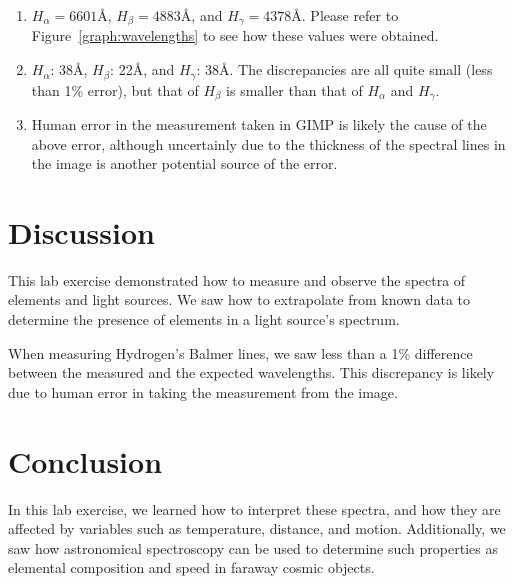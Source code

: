\documentclass[11pt]{article}
\begin{document}
\begin{enumerate}[label={\textbf{\emph{(\arabic*)}}}]
	\item %
$H_\alpha = 6601$\r{A}, $H_\beta = 4883$\r{A}, and $H_\gamma = 4378$\r{A}.
Please refer to Figure~\ref{graph:wavelengths} to see how these values were obtained.

	\item %
$H_\alpha$: 38\r{A}, $H_\beta$: 22\r{A}, and $H_\gamma$: 38\r{A}.
The discrepancies are all quite small (less than 1\% error), but that of $H_\beta$ is smaller than that of $H_\alpha$ and $H_\gamma$.

	\item %
Human error in the measurement taken in GIMP is likely the cause of the above error, although uncertainly due to the thickness of the spectral lines in the image is another potential source of the error.
\end{enumerate}


\section{Discussion}
This lab exercise demonstrated how to measure and observe the spectra of elements and light sources.
We saw how to extrapolate from known data to determine the presence of elements in a light source's spectrum.

When measuring Hydrogen's Balmer lines, we saw less than a 1\% difference between the measured and the expected wavelengths.
This discrepancy is likely due to human error in taking the measurement from the image.


\section{Conclusion}
In this lab exercise, we learned how to interpret these spectra, and how they are affected by variables such as temperature, distance, and motion.
Additionally, we saw how astronomical spectroscopy can be used to determine such properties as elemental composition and speed in faraway cosmic objects.

\printbibliography
\end{document}
